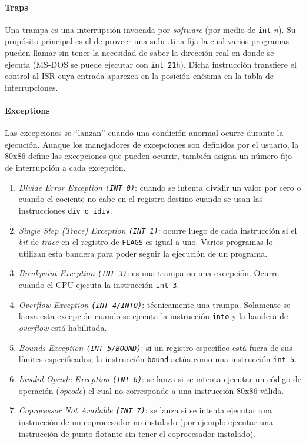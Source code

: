 \paragraph{\textnormal{\textbf{Traps}}}
Una trampa es una interrupción invocada por \textit{software} (por medio de \texttt{int} \textit{n}). Su propósito principal es el de proveer una subrutina fija la cual varios programas pueden llamar sin tener la necesidad de saber la dirección real en donde se ejecuta (MS-DOS se puede ejecutar con \texttt{int 21h}). Dicha instrucción transfiere el control al ISR cuya entrada aparezca en la posición enésima en la tabla de interrupciones. 

\paragraph{\textnormal{\textbf{Exceptions}}}
Las excepciones se ``lanzan'' cuando una condición anormal ocurre durante la ejecución. Aunque los manejadores de excepciones son definidos por el usuario, la 80x86 define las excepciones que pueden ocurrir, también asigna un número fijo de interrupción a cada excepción.

\begin{enumerate}
    \item \textit{Divide Error Exception \texttt{(INT 0)}}: cuando se intenta dividir un valor por cero o cuando el cociente no cabe en el registro destino cuando se usan las instrucciones \texttt{div \textnormal{o} idiv}.
    \item \textit{Single Step (Trace) Exception \texttt{(INT 1)}}: ocurre luego de cada instrucción si el \textit{bit} de \textit{trace} en el registro de \texttt{FLAGS} es igual a uno. Varios programas lo utilizan esta bandera para poder seguir la ejecución de un programa.
    \item \textit{Breakpoint Exception \texttt{(INT 3)}}: es una trampa no una excepción. Ocurre cuando el CPU ejecuta la instrucción \texttt{int 3}.
    \item \textit{Overflow Exception \texttt{(INT 4/INTO)}}: técnicamente una trampa. Solamente se lanza esta excepción cuando se ejecuta la instrucción \texttt{into} y la bandera de \textit{overflow} está habilitada.
    \item \textit{Bounds Exception \texttt{(INT 5/BOUND)}}: si un registro específico está fuera de sus límites especificados, la instrucción \texttt{bound} actúa como una instrucción \texttt{int 5}. 
    \item \textit{Invalid Opcode Exception \texttt{(INT 6)}}: se lanza si se intenta ejecutar un código de operación (\textit{opcode}) el cual no corresponde a una instrucción 80x86 válida. 
    \item \textit{Coprocessor Not Available \texttt{(INT 7)}}: se lanza si se intenta ejecutar una instrucción de un coprocesador no instalado (por ejemplo ejecutar una instrucción de punto flotante sin tener el coprocesador instalado). 
\end{enumerate}

